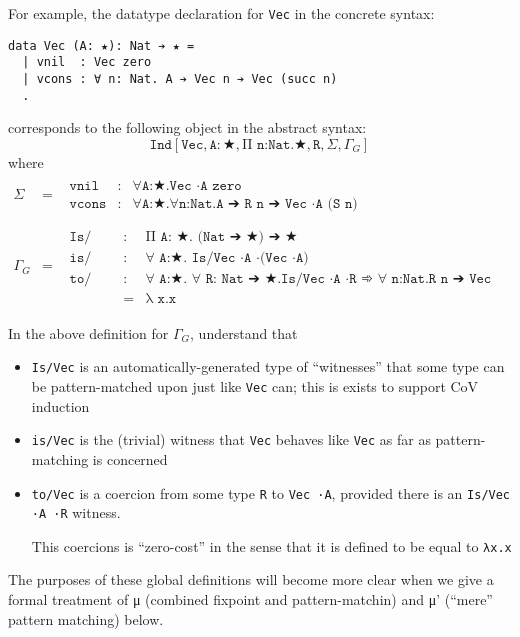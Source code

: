 \documentclass{article}
\newcommand{\ann}[2]{#1\! : \! #2}
\newcommand{\indsche}[6]{\texttt{Ind}[#1,#2,#3,#4,#5,#6]}
\begin{document}
For example, the datatype declaration for \texttt{Vec} in the concrete syntax:
\begin{verbatim}
data Vec (A: ★): Nat ➔ ★ =
  | vnil  : Vec zero
  | vcons : ∀ n: Nat. A ➔ Vec n ➔ Vec (succ n)
  .
\end{verbatim}

corresponds to the following object in the abstract syntax:
\[
  \indsche{\texttt{Vec}}{\ann{\texttt{A}}{★}}{\texttt{Π n:Nat.★}}{\texttt{R}}{\Sigma}{\Gamma_G}
\]
\noindent where
\[
  \begin{array}{lcl}
    \Sigma
    & =
    & \begin{array}{lcl}
        \texttt{vnil} & : & \texttt{∀A:★.Vec ·A zero}
        \\ \texttt{vcons} & : & \texttt{∀A:★.∀n:Nat.A ➔ R n ➔ Vec ·A (S n)}
      \end{array}
    \\ \\ \Gamma_G
    & =
    & \begin{array}{lcl}
        \texttt{Is/Vec} & : & \texttt{Π A: ★. (Nat ➔ ★) ➔ ★}
        \\ \texttt{is/Vec} & : & \texttt{∀ A:★. Is/Vec ·A ·(Vec ·A)}
        \\ \texttt{to/Vec} & : & \texttt{∀ A:★. ∀ R: Nat ➔ ★.Is/Vec ·A ·R ➾ ∀ n:Nat.R n ➔ Vec ·A n}
        \\                 & = & \texttt{λ x.x}
      \end{array}
  \end{array}
\]

\noindent In the above definition for $\Gamma_G$, understand that
\begin{itemize}
  \item \texttt{Is/Vec} is an automatically-generated type of ``witnesses''
    that some type can be pattern-matched upon just like \texttt{Vec} can; this
    is exists to support CoV induction
  \item \texttt{is/Vec} is the (trivial) witness that \texttt{Vec} behaves like
    \texttt{Vec} as far as pattern-matching is concerned
  \item \texttt{to/Vec} is a coercion from some type \texttt{R} to \texttt{Vec ·A},
    provided there is an \texttt{Is/Vec ·A ·R} witness.

    This coercions is ``zero-cost'' in the sense that it is defined to be equal
    to \texttt{λx.x}
\end{itemize}

The purposes of these global definitions will become more clear when we give a
formal treatment of μ (combined fixpoint and pattern-matchin) and μ' (``mere''
pattern matching) below.
\end{document}
